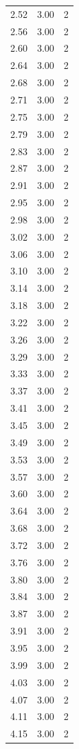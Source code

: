 \begin{longtable}{lrr}
  2.52 & 3.00 & 2 \\
  2.56 & 3.00 & 2 \\
  2.60 & 3.00 & 2 \\
  2.64 & 3.00 & 2 \\
  2.68 & 3.00 & 2 \\
  2.71 & 3.00 & 2 \\
  2.75 & 3.00 & 2 \\
  2.79 & 3.00 & 2 \\
  2.83 & 3.00 & 2 \\
  2.87 & 3.00 & 2 \\
  2.91 & 3.00 & 2 \\
  2.95 & 3.00 & 2 \\
  2.98 & 3.00 & 2 \\
  3.02 & 3.00 & 2 \\
  3.06 & 3.00 & 2 \\
  3.10 & 3.00 & 2 \\
  3.14 & 3.00 & 2 \\
  3.18 & 3.00 & 2 \\
  3.22 & 3.00 & 2 \\
  3.26 & 3.00 & 2 \\
  3.29 & 3.00 & 2 \\
  3.33 & 3.00 & 2 \\
  3.37 & 3.00 & 2 \\
  3.41 & 3.00 & 2 \\
  3.45 & 3.00 & 2 \\
  3.49 & 3.00 & 2 \\
  3.53 & 3.00 & 2 \\
  3.57 & 3.00 & 2 \\
  3.60 & 3.00 & 2 \\
  3.64 & 3.00 & 2 \\
  3.68 & 3.00 & 2 \\
  3.72 & 3.00 & 2 \\
  3.76 & 3.00 & 2 \\
  3.80 & 3.00 & 2 \\
  3.84 & 3.00 & 2 \\
  3.87 & 3.00 & 2 \\
  3.91 & 3.00 & 2 \\
  3.95 & 3.00 & 2 \\
  3.99 & 3.00 & 2 \\
  4.03 & 3.00 & 2 \\
  4.07 & 3.00 & 2 \\
  4.11 & 3.00 & 2 \\
  4.15 & 3.00 & 2 \\

\end{longtable}
